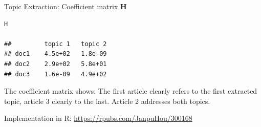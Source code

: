 \documentclass[11pt,compress,t,notes=noshow, xcolor=table]{beamer}
\begin{document}



\begin{vbframe}{Topic Extraction: Coefficient matrix $\mathbf{H}$}

\footnotesize
\vspace{0.3cm}
\begin{verbatim}
H

##         topic 1   topic 2
## doc1    4.5e+02   1.8e-09
## doc2    2.9e+02   5.8e+01
## doc3    1.6e-09   4.9e+02
\end{verbatim}



\normalsize
The coefficient matrix shows: The first article clearly refers to the first extracted topic, article 3 clearly to the last.
Article 2 addresses both topics.

\vfill

\begin{footnotesize}
Implementation in R: \url{https://rpubs.com/JanpuHou/300168}
\end{footnotesize}

\end{vbframe}

\endlecture
\end{document}
